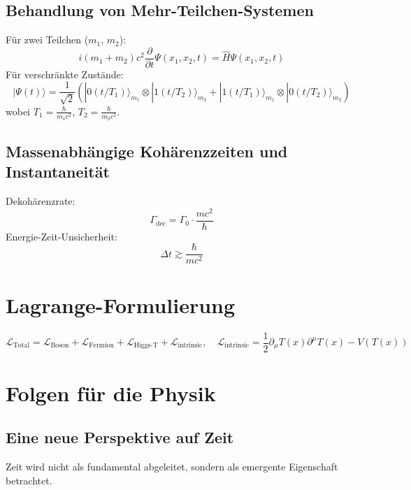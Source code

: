 \documentclass[12pt,a4paper]{article}
\newcommand{\Tfield}{T(x)}
\begin{document}
	\subsection{Behandlung von Mehr-Teilchen-Systemen}
	Für zwei Teilchen (\( m_1 \), \( m_2 \)):
	\begin{equation}
		i (m_1 + m_2) c^2 \frac{\partial}{\partial t} \Psi(x_1, x_2, t) = \hat{H} \Psi(x_1, x_2, t)
	\end{equation}
	Für verschränkte Zustände:
	\begin{equation}
		|\Psi(t)\rangle = \frac{1}{\sqrt{2}}(|0(t/T_1)\rangle_{m_1} \otimes |1(t/T_2)\rangle_{m_2} + |1(t/T_1)\rangle_{m_1} \otimes |0(t/T_2)\rangle_{m_2})
	\end{equation}
	wobei \( T_1 = \frac{\hbar}{m_1 c^2} \), \( T_2 = \frac{\hbar}{m_2 c^2} \).
	
	\subsection{Massenabhängige Kohärenzzeiten und Instantaneität}
	Dekohärenzrate:
	\begin{equation}
		\Gamma_{\text{dec}} = \Gamma_0 \cdot \frac{m c^2}{\hbar}
	\end{equation}
	Energie-Zeit-Unsicherheit:
	\begin{equation}
		\Delta t \gtrsim \frac{\hbar}{mc^2}
	\end{equation}
	
	\section{Lagrange-Formulierung}
	\begin{equation}
		\mathcal{L}_{\text{Total}} = \mathcal{L}_{\text{Boson}} + \mathcal{L}_{\text{Fermion}} + \mathcal{L}_{\text{Higgs-T}} + \mathcal{L}_{\text{intrinsic}}, \quad \mathcal{L}_{\text{intrinsic}} = \frac{1}{2} \partial_\mu \Tfield \partial^\mu \Tfield - V(\Tfield)
	\end{equation}
	
	\section{Folgen für die Physik}
	\subsection{Eine neue Perspektive auf Zeit}
	Zeit wird nicht als fundamental abgeleitet, sondern als emergente Eigenschaft betrachtet.
\end{document}
